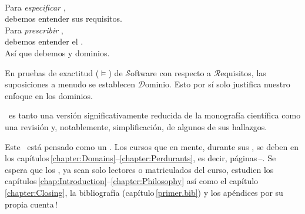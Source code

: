 \label{chap:Introduction}\label{chap:Introduction.1}
\minitoc

\begin{flushright}\label{intro:The Triptych Dogma}
\\[4mm]
\sf Para \textsl{especificar} ,\\
\sf debemos entender sus requisitos.\\[1mm]
\sf Para \textsl{prescribir} ,\\
\sf debemos entender el .\\[1mm]
\sf Así que debemos  y  dominios.\\
\end{flushright}\rm%
\mnewfoil

\noindent
\begynd
\pind En pruebas de exactitud ($\models$)
\begynd
\pind de $\mathcal{S}$oftware
\pind con respecto a $\mathcal{R}$equisitos,
\pind las suposiciones a menudo se establecen  $\mathcal{D}$ominio.
\afslut
\pind Esto por sí solo justifica nuestro enfoque en los dominios.
\afslut
\endboiteepaisseavecuntitre

\mnewfoil

\noindent
\begynd
\pind {} \manual\ es
\begynd
\pind tanto una versión significativamente reducida \nyl de la monografía científica \cite{BjornerMonograph2020} 
\pind como una revisión y, notablemente, simplificación, de algunos de sus hallazgos.
\afslut
\afslut

\label{sec:Why This Primer}

\begynd
\pind Este \manual\ está pensado como un .
\pind Los cursos que  en mente, durante sus , se deben  en los
      capítulos\,\ref{chapter:Domains}--\ref{chapter:Perdurants},
      es decir, páginas\,\pageref{chapter:Domains}--\pageref{chapter:Perdurants.n}.
\pind Se espera que los , ya sean solo lectores o matriculados del curso, estudien
      los capítulos\,\ref{chap:Introduction}--\ref{chapter:Philosophy} así
      como el capítulo\,\ref{chapter:Closing}, la bibliografía
      (capítulo\,\ref{primer.bib}) y los apéndices por su propia cuenta\,!
\afslut


